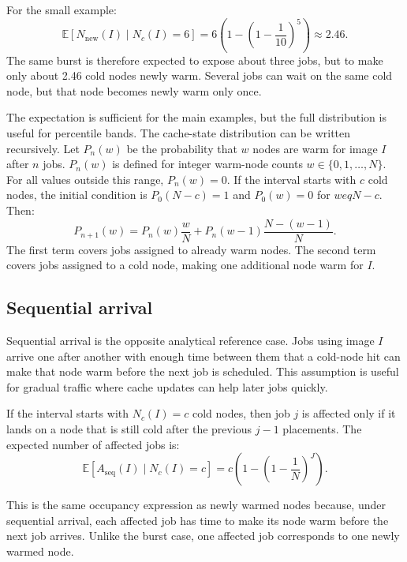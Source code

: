 \documentclass[11pt,a4paper]{article}
\newcommand{\E}{\mathbb{E}}
\begin{document}
For the small example:
\begin{equation}
\E[N_{\mathrm{new}}(I)\mid N_c(I)=6]
=
6\left(1-\left(1-\frac{1}{10}\right)^5\right)
\approx
2.46.
\end{equation}
The same burst is therefore expected to expose about three jobs, but to make only about 2.46 cold nodes newly warm. Several jobs can wait on the same cold node, but that node becomes newly warm only once.

The expectation is sufficient for the main examples, but the full distribution is useful for percentile bands. The cache-state distribution can be written recursively. Let \(P_n(w)\) be the probability that \(w\) nodes are warm for image \(I\) after \(n\) jobs. \(P_n(w)\) is defined for integer warm-node counts \(w\in\{0,1,\dots,N\}\). For all values outside this range, \(P_n(w)=0\). If the interval starts with \(c\) cold nodes, the initial condition is \(P_0(N-c)=1\) and \(P_0(w)=0\) for \(w
eq N-c\). Then:
\begin{equation}
P_{n+1}(w)
=
P_n(w)\frac{w}{N}
+
P_n(w-1)\frac{N-(w-1)}{N}.
\end{equation}
The first term covers jobs assigned to already warm nodes. The second term covers jobs assigned to a cold node, making one additional node warm for \(I\).

\subsection{Sequential arrival}

Sequential arrival is the opposite analytical reference case. Jobs using image \(I\) arrive one after another with enough time between them that a cold-node hit can make that node warm before the next job is scheduled. This assumption is useful for gradual traffic where cache updates can help later jobs quickly.

If the interval starts with \(N_c(I)=c\) cold nodes, then job \(j\) is affected only if it lands on a node that is still cold after the previous \(j-1\) placements. The expected number of affected jobs is:
\begin{equation}
\E[A_{\mathrm{seq}}(I)\mid N_c(I)=c]
=
c\left(1-\left(1-\frac{1}{N}\right)^J\right).
\end{equation}

This is the same occupancy expression as newly warmed nodes because, under sequential arrival, each affected job has time to make its node warm before the next job arrives. Unlike the burst case, one affected job corresponds to one newly warmed node.
\end{document}
